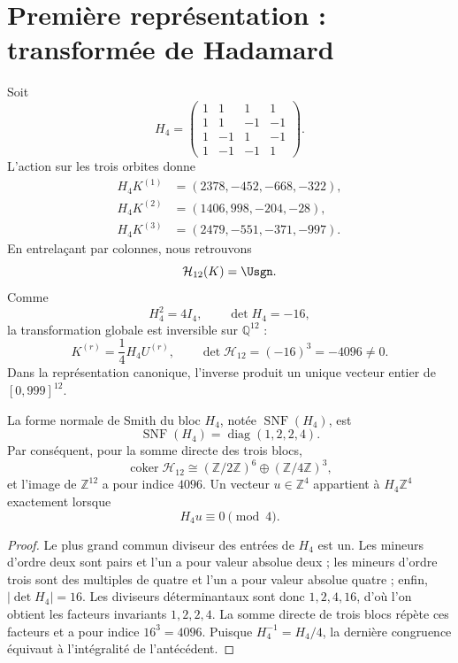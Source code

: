 \section{Première représentation : transformée de Hadamard}

Soit
\[
H_4=
\begin{pmatrix}
1&1&1&1\\
1&1&-1&-1\\
1&-1&1&-1\\
1&-1&-1&1
\end{pmatrix}.
\]
L'action sur les trois orbites donne
\[
\begin{aligned}
H_4K^{(1)}&=(2378,-452,-668,-322),\\
H_4K^{(2)}&=(1406,998,-204,-28),\\
H_4K^{(3)}&=(2479,-551,-371,-997).
\end{aligned}
\]
En entrelaçant par colonnes, nous retrouvons
\[
\mathcal H_{12}(K)=\Usgn.
\]
Comme
\[
H_4^2=4I_4,
\qquad
\det H_4=-16,
\]
la transformation globale est inversible sur \(\mathbb Q^{12}\) :
\[
K^{(r)}=\frac14H_4U^{(r)},
\qquad
\det\mathcal H_{12}=(-16)^3=-4096\ne0.
\]
Dans la représentation canonique, l'inverse produit un unique vecteur entier de
\([0,999]^{12}\).

\begin{theorem}
\label{thm:smith-hadamard}
La forme normale de Smith du bloc \(H_4\), notée
\(\operatorname{SNF}(H_4)\), est
\[
 \operatorname{SNF}(H_4)=\operatorname{diag}(1,2,2,4).
\]
Par conséquent, pour la somme directe des trois blocs,
\[
 \operatorname{coker}\mathcal H_{12}
 \cong(\mathbb Z/2\mathbb Z)^6\oplus(\mathbb Z/4\mathbb Z)^3,
\]
et l'image de \(\mathbb Z^{12}\) a pour indice \(4096\). Un vecteur
\(u\in\mathbb Z^4\) appartient à \(H_4\mathbb Z^4\) exactement lorsque
\[
 H_4u\equiv0\pmod 4.
\]
\end{theorem}

\begin{proof}
Le plus grand commun diviseur des entrées de \(H_4\) est un. Les mineurs
d'ordre deux sont pairs et l'un a pour valeur absolue deux ; les mineurs d'ordre
trois sont des multiples de quatre et l'un a pour valeur absolue quatre ;
enfin, \(\lvert\det H_4\rvert=16\). Les diviseurs déterminantaux sont
 donc \(1,2,4,16\), d'où l'on obtient les facteurs invariants
\(1,2,2,4\). La somme directe de trois blocs répète ces facteurs et a pour
indice \(16^3=4096\). Puisque \(H_4^{-1}=H_4/4\), la dernière
congruence équivaut à l'intégralité de l'antécédent.
\end{proof}

